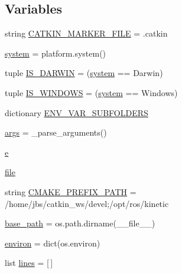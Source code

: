 \subsection*{Variables}
\begin{DoxyCompactItemize}
\item 
string \hyperlink{namespace__setup__util_a3fa0ca5a460a71a43cbc3d4954ab1f10}{C\+A\+T\+K\+I\+N\+\_\+\+M\+A\+R\+K\+E\+R\+\_\+\+F\+I\+LE} = \textquotesingle{}.catkin\textquotesingle{}
\item 
\hyperlink{namespace__setup__util_ae9fca6a80a6923f4580be72f68fee325}{system} = platform.\+system()
\item 
tuple \hyperlink{namespace__setup__util_aecbb100ce6f94bb3c7e16d58fde05f96}{I\+S\+\_\+\+D\+A\+R\+W\+IN} = (\hyperlink{namespace__setup__util_ae9fca6a80a6923f4580be72f68fee325}{system} == \textquotesingle{}Darwin\textquotesingle{})
\item 
tuple \hyperlink{namespace__setup__util_a6fe69c2dbd92959b6651a28cbb846e6e}{I\+S\+\_\+\+W\+I\+N\+D\+O\+WS} = (\hyperlink{namespace__setup__util_ae9fca6a80a6923f4580be72f68fee325}{system} == \textquotesingle{}Windows\textquotesingle{})
\item 
dictionary \hyperlink{namespace__setup__util_aa31804f1be8660156ce9394b33c68dc4}{E\+N\+V\+\_\+\+V\+A\+R\+\_\+\+S\+U\+B\+F\+O\+L\+D\+E\+RS}
\item 
\hyperlink{namespace__setup__util_a547963d07c6371df1c51b1384a2dec28}{args} = \+\_\+parse\+\_\+arguments()
\item 
\hyperlink{namespace__setup__util_acdce690b925de33d6249bbbfa1109d61}{e}
\item 
\hyperlink{namespace__setup__util_aea63a1b32cc79bc3d872ab7cb30dd07e}{file}
\item 
string \hyperlink{namespace__setup__util_a57afd3d2c076955fb715f3e72ef098eb}{C\+M\+A\+K\+E\+\_\+\+P\+R\+E\+F\+I\+X\+\_\+\+P\+A\+TH} = \textquotesingle{}/home/jbs/catkin\+\_\+ws/devel;/opt/ros/kinetic\textquotesingle{}
\item 
\hyperlink{namespace__setup__util_a83d25140acd7788bbcb95843fe38e639}{base\+\_\+path} = os.\+path.\+dirname(\+\_\+\+\_\+file\+\_\+\+\_\+)
\item 
\hyperlink{namespace__setup__util_a9a935bdd9ee1aa0327161025bb18c136}{environ} = dict(os.\+environ)
\item 
list \hyperlink{namespace__setup__util_a8618d8be5f729d4c9696daa5e083a001}{lines} = \mbox{[}$\,$\mbox{]}
\end{DoxyCompactItemize}


